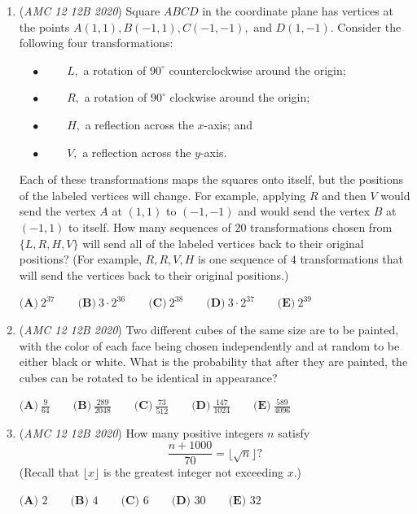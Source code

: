 \begin{enumerate}
$\textbf{(A) } \frac{7}{3} \qquad \textbf{(B) } 8-4\sqrt2 \qquad \textbf{(C) } 1+\sqrt2 \qquad \textbf{(D) } \frac{7}{4}\sqrt2 \qquad \textbf{(E) } 2\sqrt2$


	\item (\textit{AMC 12 12B 2020}) Square $ABCD$ in the coordinate plane has vertices at the points $A(1,1), B(-1,1), C(-1,-1),$ and $D(1,-1).$ Consider the following four transformations:


 $\quad\bullet\qquad$ $L,$ a rotation of $90^{\circ}$ counterclockwise around the origin;


 $\quad\bullet\qquad$ $R,$ a rotation of $90^{\circ}$ clockwise around the origin;


 $\quad\bullet\qquad$ $H,$ a reflection across the $x$-axis; and


 $\quad\bullet\qquad$ $V,$ a reflection across the $y$-axis.


 Each of these transformations maps the squares onto itself, but the positions of the labeled vertices will change. For example, applying $R$ and then $V$ would send the vertex $A$ at $(1,1)$ to $(-1,-1)$ and would send the vertex $B$ at $(-1,1)$ to itself. How many sequences of $20$ transformations chosen from $\{L, R, H, V\}$ will send all of the labeled vertices back to their original positions? (For example, $R, R, V, H$ is one sequence of $4$ transformations that will send the vertices back to their original positions.)


 $\textbf{(A)}\ 2^{37} \qquad\textbf{(B)}\ 3\cdot 2^{36} \qquad\textbf{(C)}\  2^{38} \qquad\textbf{(D)}\ 3\cdot 2^{37} \qquad\textbf{(E)}\ 2^{39}$


	\item (\textit{AMC 12 12B 2020}) Two different cubes of the same size are to be painted, with the color of each face being chosen independently and at random to be either black or white. What is the probability that after they are painted, the cubes can be rotated to be identical in appearance?


 $\textbf{(A)}\ \frac{9}{64} \qquad\textbf{(B)}\ \frac{289}{2048} \qquad\textbf{(C)}\  \frac{73}{512} \qquad\textbf{(D)}\ \frac{147}{1024} \qquad\textbf{(E)}\ \frac{589}{4096}$


	\item (\textit{AMC 12 12B 2020}) How many positive integers $n$ satisfy
 \[\frac{n+1000}{70} = \lfloor \sqrt{n} \rfloor?\](Recall that $\lfloor x\rfloor$ is the greatest integer not exceeding $x$.)


 $\textbf{(A) } 2 \qquad\textbf{(B) } 4 \qquad\textbf{(C) } 6 \qquad\textbf{(D) } 30 \qquad\textbf{(E) } 32$



\end{enumerate}
